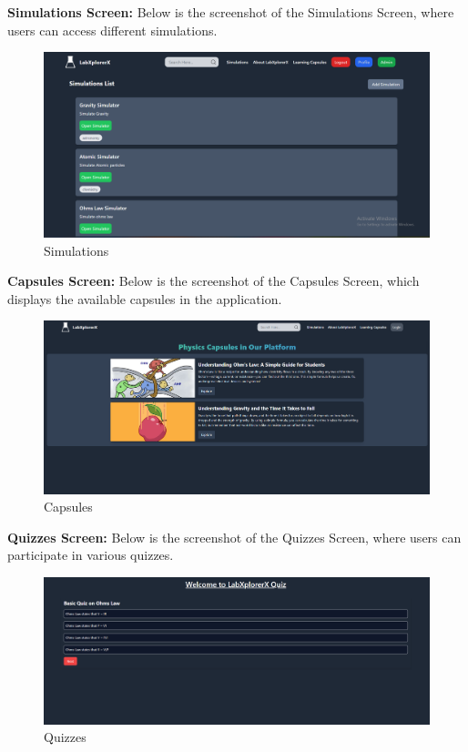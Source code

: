 \textbf{Simulations Screen:} Below is the screenshot of the Simulations Screen, where users can access different simulations.
\begin{figure}[H]
    \centering
    \includegraphics[width = 15cm]{Diagrams/output/simulations.png}
    \caption{Simulations}
\end{figure}

\textbf{Capsules Screen:} Below is the screenshot of the Capsules Screen, which displays the available capsules in the application.
\begin{figure}[H]
    \centering
    \includegraphics[width = 16cm]{Diagrams/output/capsules.png}
    \caption{Capsules}
\end{figure}

\textbf{Quizzes Screen:} Below is the screenshot of the Quizzes Screen, where users can participate in various quizzes.
\begin{figure}[H]
    \centering
    \includegraphics[width = 16cm]{Diagrams/output/quiz.png}
    \caption{Quizzes}
\end{figure}
\newpage

